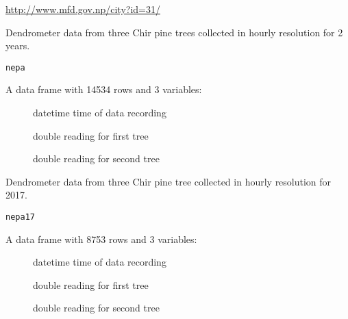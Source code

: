 \documentclass[a4paper]{book}
\begin{document}
%
\begin{Source}\relax
\url{http://www.mfd.gov.np/city?id=31/}
\end{Source}
%
\begin{Description}\relax
Dendrometer data from three Chir pine trees collected in hourly resolution for 2 years.
\end{Description}
%
\begin{Usage}
\begin{verbatim}
nepa
\end{verbatim}
\end{Usage}
%
\begin{Format}
A data frame with 14534 rows and 3 variables:
\begin{description}

\item[] datetime time of data recording
\item[] double reading for first tree
\item[] double reading for second tree

\end{description}

\end{Format}
%
\begin{Description}\relax
Dendrometer data from three Chir pine tree collected in hourly resolution for 2017.
\end{Description}
%
\begin{Usage}
\begin{verbatim}
nepa17
\end{verbatim}
\end{Usage}
%
\begin{Format}
A data frame with 8753 rows and 3 variables:
\begin{description}

\item[] datetime time of data recording
\item[] double reading for first tree
\item[] double reading for second tree

\end{description}

\end{Format}
\end{document}
